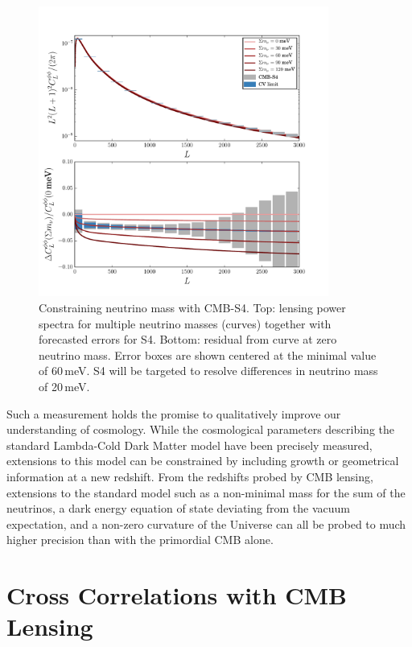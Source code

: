 \begin{figure}[htbp]
\centering
\includegraphics[width=0.85\textwidth]{CMBLensing/s4errors.pdf}
\caption{Constraining neutrino mass with CMB-S4.  Top: lensing power spectra for multiple neutrino masses (curves) together with forecasted errors for S4.  Bottom: residual from curve at zero neutrino mass.  Error boxes are shown centered at the minimal value of $60$\,meV.  S4 will be targeted to resolve differences in neutrino mass of 20\,meV. }
\label{Neutrinos}
\end{figure}

 
Such a measurement holds the promise to qualitatively improve our understanding of cosmology.  While the cosmological parameters describing the standard 
Lambda-Cold Dark Matter model have been precisely measured, extensions to this model can be constrained by including growth or geometrical information at a new redshift.  From the redshifts probed by CMB lensing, extensions to the standard model such as a non-minimal mass for the sum of the neutrinos, a dark energy equation of state deviating from the vacuum expectation, and a non-zero curvature of the Universe can all be probed to much higher precision than with the primordial CMB alone. 



\section{Cross Correlations with CMB Lensing}\label{cross}

